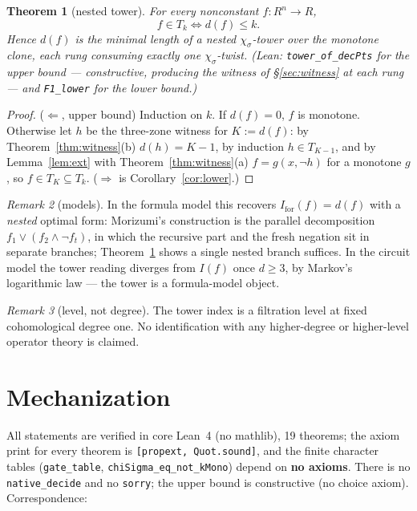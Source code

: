 \documentclass[11pt]{article}
\newtheorem{theorem}{Theorem}[section]
\theoremstyle{remark}
\newtheorem{remark}[theorem]{Remark}
\newcommand{\chis}{\chi_\sigma}
\begin{document}
\begin{theorem}[nested tower]\label{thm:tower}
For every nonconstant $f:R^n\to R$,
\[
f\in T_k \iff d(f)\le k.
\]
Hence $d(f)$ is the minimal length of a nested $\chis$-tower over the
monotone clone, each rung consuming exactly one $\chis$-twist. (Lean:
\texttt{tower\_of\_decPts} for the upper bound --- constructive, producing
the witness of \S\ref{sec:witness} at each rung --- and \texttt{F1\_lower}
for the lower bound.)
\end{theorem}

\begin{proof}
($\Leftarrow$, upper bound) Induction on $k$. If $d(f)=0$, $f$ is monotone.
Otherwise let $h$ be the three-zone witness for $K:=d(f)$: by
Theorem~\ref{thm:witness}(b) $d(h)=K-1$, by induction $h\in T_{K-1}$, and by
Lemma~\ref{lem:ext} with Theorem~\ref{thm:witness}(a) $f=g(x,\neg h)$ for a
monotone $g$, so $f\in T_K\subseteq T_k$. ($\Rightarrow$ is
Corollary~\ref{cor:lower}.)
\end{proof}

\begin{remark}[models]\label{rem:models}
In the formula model this recovers $I_{\mathrm{for}}(f)=d(f)$
\cite{morizumi} with a \emph{nested} optimal form: Morizumi's construction
is the parallel decomposition $f_1\vee(f_2\wedge\neg f_t)$, in which the
recursive part and the fresh negation sit in separate branches;
Theorem~\ref{thm:tower} shows a single nested branch suffices. In the
circuit model the tower reading diverges from $I(f)$ once $d\ge 3$, by
Markov's logarithmic law --- the tower is a formula-model object.
\end{remark}

\begin{remark}[level, not degree]\label{rem:level}
The tower index is a filtration level at fixed cohomological degree one. No
identification with any higher-degree or higher-level operator theory is
claimed.
\end{remark}

\section{Mechanization}\label{sec:lean}

All statements are verified in core Lean~4 (no mathlib), 19 theorems; the
axiom print for every theorem is \texttt{[propext, Quot.sound]}, and the
finite character tables (\texttt{gate\_table},
\texttt{chiSigma\_eq\_not\_kMono}) depend on \textbf{no axioms}. There is no
\texttt{native\_decide} and no \texttt{sorry}; the upper bound is
constructive (no choice axiom). Correspondence:
\end{document}
